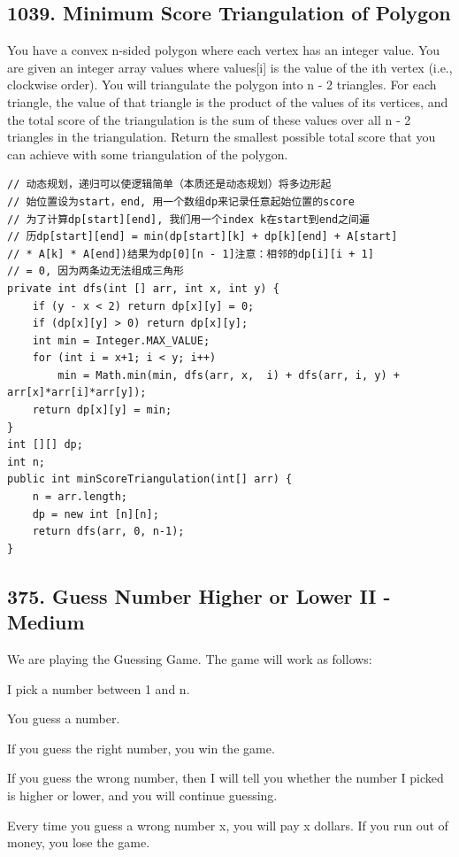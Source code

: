 \documentclass[9pt, b5paaper]{book}
\begin{document}
\subsection{1039. Minimum Score Triangulation of Polygon}
\label{sec-1-4-37}
You have a convex n-sided polygon where each vertex has an integer value. You are given an integer array values where values[i] is the value of the ith vertex (i.e., clockwise order).
You will triangulate the polygon into n - 2 triangles. For each triangle, the value of that triangle is the product of the values of its vertices, and the total score of the triangulation is the sum of these values over all n - 2 triangles in the triangulation.
Return the smallest possible total score that you can achieve with some triangulation of the polygon.
\begin{verbatim}
// 动态规划，递归可以使逻辑简单（本质还是动态规划）将多边形起
// 始位置设为start，end, 用一个数组dp来记录任意起始位置的score
// 为了计算dp[start][end], 我们用一个index k在start到end之间遍
// 历dp[start][end] = min(dp[start][k] + dp[k][end] + A[start]
// * A[k] * A[end])结果为dp[0][n - 1]注意：相邻的dp[i][i + 1]
// = 0, 因为两条边无法组成三角形
private int dfs(int [] arr, int x, int y) {
    if (y - x < 2) return dp[x][y] = 0;
    if (dp[x][y] > 0) return dp[x][y];
    int min = Integer.MAX_VALUE;
    for (int i = x+1; i < y; i++) 
        min = Math.min(min, dfs(arr, x,  i) + dfs(arr, i, y) + arr[x]*arr[i]*arr[y]);
    return dp[x][y] = min;
}
int [][] dp;
int n;
public int minScoreTriangulation(int[] arr) {
    n = arr.length;
    dp = new int [n][n];
    return dfs(arr, 0, n-1);
}
\end{verbatim}

\subsection{375. Guess Number Higher or Lower II - Medium}
\label{sec-1-4-38}
We are playing the Guessing Game. The game will work as follows:

I pick a number between 1 and n.

You guess a number.

If you guess the right number, you win the game.

If you guess the wrong number, then I will tell you whether the number I picked is higher or lower, and you will continue guessing.

Every time you guess a wrong number x, you will pay x dollars. If you run out of money, you lose the game.
\end{document}
